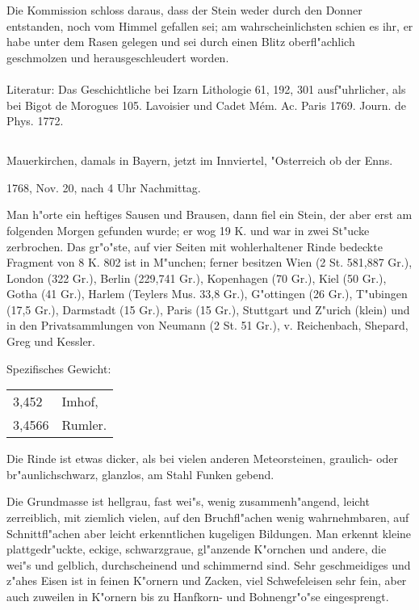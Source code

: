 \documentclass[a4paper, 11pt, oneside]{article}
\begin{document}
Die Kommission schloss daraus, dass der Stein weder durch den Donner entstanden, noch vom Himmel gefallen sei; am wahrscheinlichsten schien es ihr, er habe unter dem Rasen gelegen und sei durch einen Blitz oberfl"achlich geschmolzen und herausgeschleudert worden.
\normalsize
\paragraph{}
Literatur: Das Geschichtliche bei Izarn Lithologie 61, 192, 301 ausf"uhrlicher, als bei Bigot de Morogues 105. Lavoisier und Cadet Mém. Ac. Paris 1769. Journ. de Phys. 1772.
\subsection{}
\LARGE
\paragraph{}
Mauerkirchen, damals in Bayern, jetzt im Innviertel, "Osterreich ob der Enns.

1768, Nov. 20, nach 4 Uhr Nachmittag.

Man h"orte ein heftiges Sausen und Brausen, dann fiel ein Stein, der aber erst am folgenden Morgen gefunden wurde; er wog 19 K. und war in zwei St"ucke zerbrochen. Das gr"o"ste, auf vier Seiten mit wohlerhaltener Rinde bedeckte Fragment von 8 K. 802 ist in M"unchen; ferner besitzen Wien (2 St. 581,887 Gr.), London (322 Gr.), Berlin (229,741 Gr.), Kopenhagen (70 Gr.), Kiel (50 Gr.), Gotha (41 Gr.), Harlem (Teylers Mus. 33,8 Gr.), G"ottingen (26 Gr.), T"ubingen (17,5 Gr.), Darmstadt (15 Gr.), Paris (15 Gr.), Stuttgart und Z"urich (klein) und in den Privatsammlungen von Neumann (2 St. 51 Gr.), v. Reichenbach, Shepard, Greg und Kessler.

Spezifisches Gewicht:
\begin{table}[!ht]
    \centering\swabfamily\Large
    \begin{tabular}{l l}
        3,452 & Imhof,\\
        3,4566 & Rumler.
    \end{tabular}
\end{table}

Die Rinde ist etwas dicker, als bei vielen anderen Meteorsteinen, graulich- oder br"aunlichschwarz, glanzlos, am Stahl Funken gebend.

Die Grundmasse ist hellgrau, fast wei"s, wenig zusammenh"angend, leicht zerreiblich, mit ziemlich vielen, auf den Bruchfl"achen wenig wahrnehmbaren, auf Schnittfl"achen aber leicht erkenntlichen kugeligen Bildungen. Man erkennt kleine plattgedr"uckte, eckige, schwarzgraue, gl"anzende K"ornchen und andere, die wei"s und gelblich, durchscheinend und schimmernd sind. Sehr geschmeidiges und z"ahes Eisen ist in feinen K"ornern und Zacken, viel Schwefeleisen sehr fein, aber auch zuweilen in K"ornern bis zu Hanfkorn- und Bohnengr"o"se eingesprengt.
\end{document}

